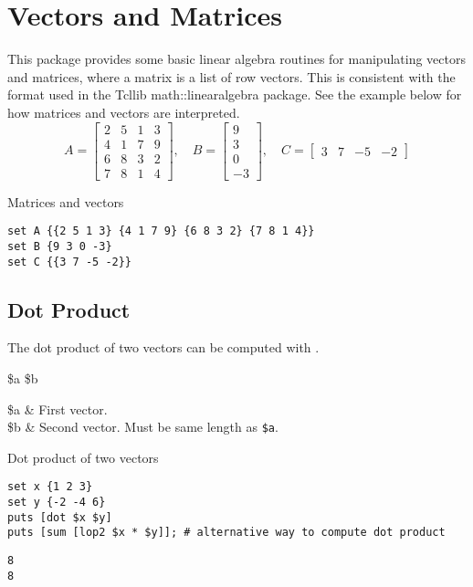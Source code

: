 \documentclass{article}
\begin{document}
\section{Vectors and Matrices}
This package provides some basic linear algebra routines for manipulating vectors and matrices, where a matrix is a list of row vectors. 
This is consistent with the format used in the Tcllib math::linearalgebra package.
See the example below for how matrices and vectors are interpreted.
\begin{equation*}\label{eq:matrix_AB}
A=\begin{bmatrix}
2 & 5 & 1 & 3 \\
4 & 1 & 7 & 9 \\
6 & 8 & 3 & 2 \\
7 & 8 & 1 & 4
\end{bmatrix},\quad
B=\begin{bmatrix}
9 \\ 3 \\ 0 \\ -3
\end{bmatrix},\quad
C = \begin{bmatrix}
3 & 7 & -5 & -2
\end{bmatrix}
\end{equation*}
\begin{example}{Matrices and vectors}
\begin{lstlisting}
set A {{2 5 1 3} {4 1 7 9} {6 8 3 2} {7 8 1 4}}
set B {9 3 0 -3}
set C {{3 7 -5 -2}}
\end{lstlisting}
\end{example}

\subsection{Dot Product}
The dot product of two vectors can be computed with .
\begin{syntax}
 \$a \$b
\end{syntax}
\begin{args}
\$a & First vector. \\
\$b & Second vector. Must be same length as \texttt{\$a}.
\end{args}

\begin{example}{Dot product of two vectors}
\begin{lstlisting}
set x {1 2 3}
set y {-2 -4 6}
puts [dot $x $y]
puts [sum [lop2 $x * $y]]; # alternative way to compute dot product
\end{lstlisting}
\tcblower
\begin{lstlisting}
8
8
\end{lstlisting}
\end{example}
\clearpage
\end{document}
